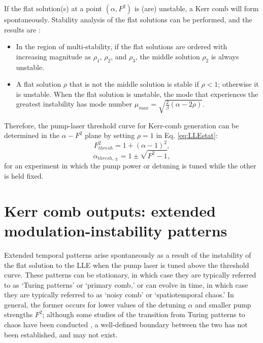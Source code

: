 {If the flat solution(s) at a point $(\alpha,F^2)$ is (are) unstable, a Kerr comb will form spontaneously. Stability analysis of the flat solutions can be performed, and the results are \cite{Godey2014}:
\begin{itemize}
	\item In the region of multi-stability, if the flat solutions are ordered with increasing magnitude as $\rho_1$, $\rho_2$, and $\rho_3$, the middle solution $\rho_2$ is always unstable. 
	\item A flat solution $\rho$ that is not the middle solution is stable if $\rho<1$; otherwise it is unstable. When the flat solution is unstable, the mode that experiences the greatest instability has mode number $\mu_{max}=\sqrt{\frac{2}{\beta}(\alpha-2\rho)}$.  
\end{itemize}

Therefore, the pump-laser threshold curve for Kerr-comb generation can be determined in the $\alpha-F^2$ plane by setting $\rho=1$ in Eq. \ref{eq:LLEstat}: 
\begin{equation}
F^2_{thresh}=1+(\alpha-1)^2, \label{eq:F2thresh}
\end{equation}
\begin{equation}
\alpha_{thresh,\pm}=1\pm\sqrt{F^2-1}, \label{eq:alphathresh}
\end{equation}
for an experiment in which the pump power or detuning is tuned while the other is held fixed. 



\section{Kerr comb outputs: extended modulation-instability patterns}

Extended temporal patterns arise spontaneously as a result of the instability of the flat solution to the LLE when the pump laser is tuned above the threshold curve. These patterns can be stationary, in which case they are typically referred to as `Turing patterns' or `primary comb,' or can evolve in time, in which case they are typically referred to as `noisy comb' or `spatiotemporal chaos.' In general, the former occurs for lower values of the detuning $\alpha$ and smaller pump strengths $F^2$; although some studies of the transition from Turing patterns to chaos have been conducted \cite{Coillet2014,others}, a well-defined boundary between the two has not been established, and may not exist. 

}
